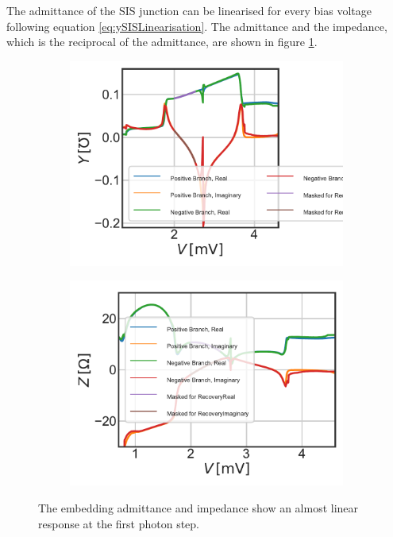 \documentclass[]{article}
\begin{document}
The admittance of the SIS junction can be linearised for every bias voltage following equation \ref{eq:ySISLinearisation}. The admittance and the impedance, which is the reciprocal of the admittance, are shown in figure \ref{fig:ySIS}.

\begin{figure}
	\centering              
	\begin{subfigure}[t]{0.49\textwidth}
		\centering
		\includegraphics[width=\linewidth]{./../Mixer_Unit_Test/2020_01_12_FixedMask/Admittance_Junction.pdf}
	\end{subfigure}
	\begin{subfigure}[t]{0.49\textwidth}
		\centering
		\includegraphics[width=\linewidth]{./../Mixer_Unit_Test/2020_01_12_FixedMask/Impedance_Junction.pdf}
	\end{subfigure}
	\caption[]{The embedding admittance and impedance show an almost linear response at the first photon step.
	}
	\label{fig:ySIS}
\end{figure}
\end{document}
